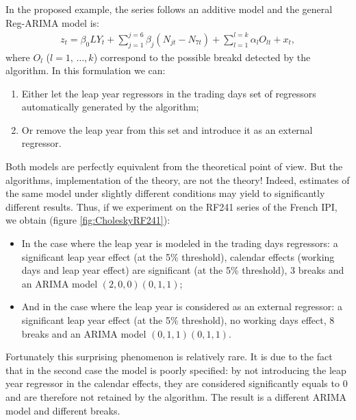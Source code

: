 \documentclass[12pt, a4paper]{article}
\begin{document}
In the proposed example, the series follows an additive model and the general Reg-ARIMA model is:
\begin{eqnarray}
	\label{eq:eq4}
z_t=\beta_0 LY_t + \sum_{j=1}^{j=6} \beta_j \left(N_{jt} - N_{7t}\right) + \sum_{l=1}^{l=k} \alpha_l O_{lt} + x_t,
\end{eqnarray}
where $O_l$ ($l=1,\, \ldots, k$) correspond to the possible breakd detected by the algorithm. In this formulation we can:
\begin{enumerate}
	\item Either let the leap year regressors in the trading days set of regressors automatically generated by the algorithm;
	\item Or remove the leap year from this set and introduce it as an external regressor.
\end{enumerate}
Both models are perfectly equivalent from the theoretical point of view. But the algorithms, implementation of the theory, are not the theory! Indeed, estimates of the same model under slightly different conditions may yield to significantly different results. Thus, if we experiment on the RF241 series of the French IPI, we obtain (figure \ref{fig:CholeskyRF241}):
\begin{itemize}
	\item In the case where the leap year is modeled in the trading days regressors: a significant leap year effect (at the 5\% threshold), calendar effects (working days and leap year effect) are significant (at the 5\% threshold), 3 breaks and an ARIMA model $(2,0,0)(0,1,1)$;
	\item And in the case where the leap year is considered as an external regressor: a significant leap year effect (at the 5\% threshold), no working days effect, 8 breaks and an ARIMA model $(0,1,1)(0,1,1)$.
\end{itemize}

Fortunately this surprising phenomenon is relatively rare. It is due to the fact that in the second case the model is poorly specified: by not introducing the leap year regressor in the calendar effects, they are considered significantly equals to 0 and are therefore not retained by the algorithm. The result is a different ARIMA model and different breaks.
\end{document}

